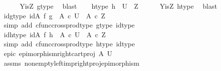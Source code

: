 \begin{isabellebody}
\ \ \ \ \isamarkupfalse%
\ Y{\isacharunderscore}{\kern0pt}is{\isacharunderscore}{\kern0pt}Z\ g{\isacharunderscore}{\kern0pt}type\ \isamarkupfalse%
\ blast\isanewline
\ \ \isamarkupfalse%
\ h{\isacharunderscore}{\kern0pt}type{}{\isacharcolon}{\kern0pt}\ {\isachardoublequoteopen}h\ {\isacharcolon}{\kern0pt}\ U\ {\isasymrightarrow}\ Z{\isachardoublequoteclose}\isanewline
\ \ \ \ \isamarkupfalse%
\ Y{\isacharunderscore}{\kern0pt}is{\isacharunderscore}{\kern0pt}Z\ h{\isacharunderscore}{\kern0pt}type\ \isamarkupfalse%
\ blast\isanewline
\ \ \isamarkupfalse%
\ idg{\isacharunderscore}{\kern0pt}type{\isacharcolon}{\kern0pt}\ {\isachardoublequoteopen}{\isacharparenleft}{\kern0pt}id{\isacharparenleft}{\kern0pt}A{\isacharparenright}{\kern0pt}\ {\isasymtimes}\isactrlsub f\ g{\isacharparenright}{\kern0pt}\ {\isacharcolon}{\kern0pt}\ A\ {\isasymtimes}\isactrlsub c\ U\ {\isasymrightarrow}\ A\ {\isasymtimes}\isactrlsub c\ Z{\isachardoublequoteclose}\isanewline
\ \ \ \ \isamarkupfalse%
\ {\isacharparenleft}{\kern0pt}simp\ add{\isacharcolon}{\kern0pt}\ cfunc{\isacharunderscore}{\kern0pt}cross{\isacharunderscore}{\kern0pt}prod{\isacharunderscore}{\kern0pt}type\ g{\isacharunderscore}{\kern0pt}type{}\ id{\isacharunderscore}{\kern0pt}type{\isacharparenright}{\kern0pt}\isanewline
\ \ \isamarkupfalse%
\ idh{\isacharunderscore}{\kern0pt}type{\isacharcolon}{\kern0pt}\ {\isachardoublequoteopen}{\isacharparenleft}{\kern0pt}id{\isacharparenleft}{\kern0pt}A{\isacharparenright}{\kern0pt}\ {\isasymtimes}\isactrlsub f\ h{\isacharparenright}{\kern0pt}\ {\isacharcolon}{\kern0pt}\ A\ {\isasymtimes}\isactrlsub c\ U\ {\isasymrightarrow}\ A\ {\isasymtimes}\isactrlsub c\ Z{\isachardoublequoteclose}\isanewline
\ \ \ \ \isamarkupfalse%
\ {\isacharparenleft}{\kern0pt}simp\ add{\isacharcolon}{\kern0pt}\ cfunc{\isacharunderscore}{\kern0pt}cross{\isacharunderscore}{\kern0pt}prod{\isacharunderscore}{\kern0pt}type\ h{\isacharunderscore}{\kern0pt}type{}\ id{\isacharunderscore}{\kern0pt}type{\isacharparenright}{\kern0pt}\isanewline
\isanewline
\ \ \ \isamarkupfalse%
\ \isamarkupfalse%
\ epic{\isacharcolon}{\kern0pt}\ {\isachardoublequoteopen}epimorphism{\isacharparenleft}{\kern0pt}right{\isacharunderscore}{\kern0pt}cart{\isacharunderscore}{\kern0pt}proj\ A\ U{\isacharparenright}{\kern0pt}{\isachardoublequoteclose}\isanewline
\ \ \ \ \ \isamarkupfalse%
\ assms{\isacharparenleft}{\kern0pt}{}{\isacharparenright}{\kern0pt}\ nonempty{\isacharunderscore}{\kern0pt}left{\isacharunderscore}{\kern0pt}imp{\isacharunderscore}{\kern0pt}right{\isacharunderscore}{\kern0pt}proj{\isacharunderscore}{\kern0pt}epimorphism\ \isamarkupfalse%

\end{isabellebody}
